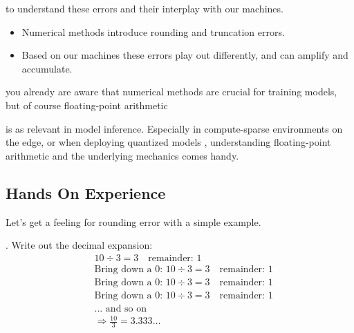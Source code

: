  to understand these errors and their interplay with our machines.
\begin{itemize}
    \item Numerical methods introduce rounding and truncation errors.
    \item Based on our machines these errors play out differently, and can amplify and accumulate.
\end{itemize} 



 you already are aware that numerical methods are crucial for training models, but of course floating-point arithmetic

is as relevant in model inference. Especially in compute-sparse environments on the edge, or when deploying quantized models \cite{courbariauxbnn}, understanding floating-point arithmetic and the underlying mechanics comes handy.





\newpage
\subsection{Hands On Experience}

Let's get a feeling for rounding error with a simple example.

. Write out the decimal expansion:
\begin{align*}
    &10 \div 3 = 3 \quad \text{remainder: } 1 \\
    &\text{Bring down a 0: } 10 \div 3 = 3 \quad \text{remainder: } 1 \\
    &\text{Bring down a 0: } 10 \div 3 = 3 \quad \text{remainder: } 1 \\
    &\text{Bring down a 0: } 10 \div 3 = 3 \quad \text{remainder: } 1 \\
    &\text{... and so on} \\
    &\Rightarrow \frac{10}{3} = 3.333\ldots
\end{align*}


